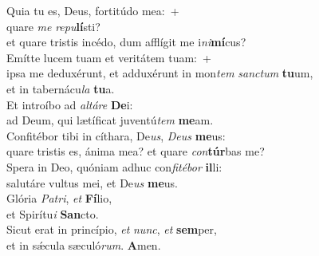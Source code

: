 \evenverse Quia tu es, Deus, fortitúdo mea:~+\\\evenverse  quare \textit{me} \textit{re}\textit{pu}\textbf{lí}sti?~\*\\
\evenverse et quare tristis incédo, dum afflígit me i\textit{ni}\textbf{mí}cus?\\
\oddverse Emítte lucem tuam et veritátem tuam:~+\\
\oddverse  ipsa me deduxérunt, et adduxérunt in mon\textit{tem} \textit{san}\textit{ctum} \textbf{tu}um,~\*\\
\oddverse et in tabernácu\textit{la} \textbf{tu}a.\\
\evenverse Et introíbo ad \textit{al}\textit{tá}\textit{re} \textbf{De}i:~\*\\
\evenverse ad Deum, qui lætíficat juventú\textit{tem} \textbf{me}am.\\
\oddverse Confitébor tibi in cíthara, De\textit{us}, \textit{De}\textit{us} \textbf{me}us:~\*\\
\oddverse quare tristis es, ánima mea? et quare \textit{con}\textbf{túr}bas me?\\
\evenverse Spera in Deo, quóniam adhuc con\textit{fi}\textit{té}\textit{bor} \textbf{il}li:~\*\\
\evenverse salutáre vultus mei, et De\textit{us} \textbf{me}us.\\
\oddverse Glória \textit{Pa}\textit{tri}, \textit{et} \textbf{Fí}lio,~\*\\
\oddverse et Spirítu\textit{i} \textbf{San}cto.\\
\evenverse Sicut erat in princípio, \textit{et} \textit{nunc}, \textit{et} \textbf{sem}per,~\*\\
\evenverse et in sǽcula sæculó\textit{rum}. \textbf{A}men.\\
